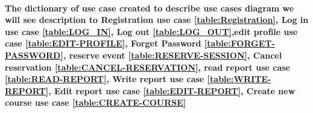 \documentclass[../Psychological_system_web_application.tex]{subfiles}
\begin{document}
							\paragraph{The dictionary of use case created to describe use cases diagram we will see description to Registration use case \ref{table:Registration}, Log in use case \ref{table:LOG_IN}, Log out \ref{table:LOG_OUT},edit profile use case \ref{table:EDIT-PROFILE}, Forget Password \ref{table:FORGET-PASSWORD}, reserve event \ref{table:RESERVE-SESSION}, Cancel reservation \ref{table:CANCEL-RESERVATION}, read report use case \ref{table:READ-REPORT}, Write report use case \ref{table:WRITE-REPORT}, Edit report use case \ref{table:EDIT-REPORT}, Create new course use case \ref{table:CREATE-COURSE}}
\end{document}
